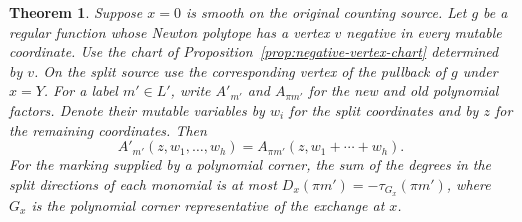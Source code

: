 \documentclass[11pt,reqno]{amsart}
\numberwithin{equation}{section}
\newtheorem{theorem}{Theorem}[section]
\theoremstyle{definition}
\theoremstyle{remark}
\begin{document}
\begin{theorem}\label{thm:split-coordinate}
Suppose \(x=0\) is smooth on the original counting source. Let \(g\)
be a regular function whose Newton polytope has a vertex \(v\) negative
in every mutable coordinate. Use the chart of
Proposition~\ref{prop:negative-vertex-chart} determined by \(v\).
On the split source use the corresponding vertex of the pullback of
\(g\) under \(x=Y\). For a label \(m'\in L'\), write
\(A'_{m'}\) and \(A_{\pi m'}\) for the new and old polynomial
factors. Denote their mutable variables by \(w_i\) for the split
coordinates and by \(z\) for the remaining coordinates. Then
\[ A'_{m'}(z,w_1,\ldots,w_h)=A_{\pi m'}(z,w_1+\cdots+w_h). \]
For the marking supplied by a polynomial corner, the sum of the degrees
in the split directions of each monomial is at most
\(D_x(\pi m')=-\tau_{G_x}(\pi m')\), where \(G_x\) is the polynomial
corner representative of the exchange at \(x\).
\end{theorem}
\end{document}
